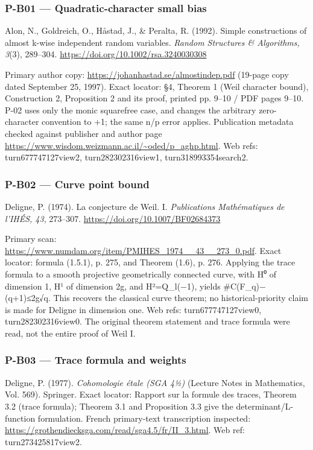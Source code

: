 \documentclass[11pt,a4paper]{article}
\theoremstyle{definition}\newtheorem{definition}{Definition}
\begin{document}
\subsubsection{P-B01 --- Quadratic-character small
bias}\label{p-b01--quadratic-character-small-bias}

Alon, N., Goldreich, O., Håstad, J., \& Peralta, R. (1992). Simple
constructions of almost k-wise independent random variables.
\emph{Random Structures \& Algorithms, 3}(3), 289--304.
\url{https://doi.org/10.1002/rsa.3240030308}

Primary author copy: \url{https://johanhastad.se/almostindep.pdf}
(19-page copy dated September 25, 1997). Exact locator: §4, Theorem 1
(Weil character bound), Construction 2, Proposition 2 and its proof,
printed pp. 9--10 / PDF pages 9--10. P-02 uses only the monic squarefree
case, and changes the arbitrary zero-character convention to +1; the
same n/p error applies. Publication metadata checked against publisher
and author page
\url{https://www.wisdom.weizmann.ac.il/~oded/p_aghp.html}. Web refs:
turn677747127view2, turn282302316view1, turn318993354search2.

\subsubsection{P-B02 --- Curve point
bound}\label{p-b02--curve-point-bound}

Deligne, P. (1974). La conjecture de Weil. I. \emph{Publications
Mathématiques de l'IHÉS, 43}, 273--307.
\url{https://doi.org/10.1007/BF02684373}

Primary scan:
\url{https://www.numdam.org/item/PMIHES_1974__43__273_0.pdf}. Exact
locator: formula (1.5.1), p. 275, and Theorem (1.6), p. 276. Applying
the trace formula to a smooth projective geometrically connected curve,
with H⁰ of dimension 1, H¹ of dimension 2g, and H²=Q\_l(−1), yields
\textbar\#C(F\_q)−(q+1)\textbar≤2g√q. This recovers the classical curve
theorem; no historical-priority claim is made for Deligne in dimension
one. Web refs: turn677747127view0, turn282302316view0. The original
theorem statement and trace formula were read, not the entire proof of
Weil I.

\subsubsection{P-B03 --- Trace formula and
weights}\label{p-b03--trace-formula-and-weights}

Deligne, P. (1977). \emph{Cohomologie étale (SGA 4½)} (Lecture Notes in
Mathematics, Vol. 569). Springer. Exact locator: Rapport sur la formule
des traces, Theorem 3.2 (trace formula); Theorem 3.1 and Proposition 3.3
give the determinant/L-function formulation. French primary-text
transcription inspected:
\url{https://grothendiecksga.com/read/sga4.5/fr/II_3.html}. Web ref:
turn273425817view2.
\end{document}
